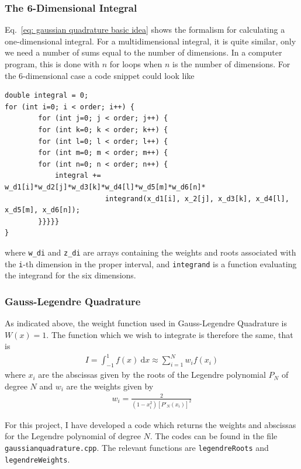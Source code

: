 \documentclass[twoside, 11pt]{article}
\renewcommand{\d}{\mathrm{d}}
\begin{document}
		\subsubsection{The 6-Dimensional Integral}\label{section: the 6-dimensional integral}
			Eq.~\eqref{eq: gaussian quadrature basic idea} shows the formalism for calculating a one-dimensional integral. For a multidimensional integral, it is quite similar, only we need a number of sums equal to the number of dimensions. In a computer program, this is done with $n$ for loops when $n$ is the number of dimensions. For the 6-dimensional case a code snippet could look like
			
			\begin{lstlisting}
double integral = 0;
for (int i=0; i < order; i++) {
		for (int j=0; j < order; j++) {
		for (int k=0; k < order; k++) {
		for (int l=0; l < order; l++) {
		for (int m=0; m < order; m++) {
		for (int n=0; n < order; n++) {
			integral += w_d1[i]*w_d2[j]*w_d3[k]*w_d4[l]*w_d5[m]*w_d6[n]*
						integrand(x_d1[i], x_2[j], x_d3[k], x_d4[l], x_d5[m], x_d6[n]);
		}}}}}
}
			\end{lstlisting}
			where \texttt{w\_di} and \texttt{z\_di} are arrays containing the weights and roots associated with the \texttt{i}-th dimension in the proper interval, and \texttt{integrand} is a function evaluating the integrand for the six dimensions. 
			
		
		\subsubsection{Gauss-Legendre Quadrature}
			As indicated above, the weight function used in Gauss-Legendre Quadrature is $W(x)=1$. The function which we wish to integrate is therefore the same, that is
			\begin{align}
				I = \int_{-1}^{1} f(x) \ \d x \approx \sum_{i=1}^N w_i f(x_i)
			\end{align}
			where $x_i$ are the abscissas  given by the roots of the Legendre polynomial $P_N$ of degree $N$ and $w_i$ are the weights given by
			\begin{align*}
				w_i = \frac{2}{(1-x_i^2)[P'_N(x_i)]^2}
			\end{align*}
			
			For this project, I have developed a code which returns the weights and  abscissas for the Legendre polynomial of degree $N$. The codes can be found in the file \texttt{gaussianquadrature.cpp}. The relevant functions are \texttt{legendreRoots} and \texttt{legendreWeights}.
			
\end{document}
